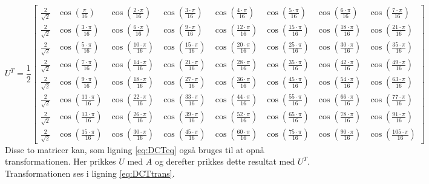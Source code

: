 \begin{equation}
U^T = \frac{1}{2}
\begin{bmatrix}
\frac{2}{\sqrt{2}} & \cos(\frac{\pi}{16}) & \cos(\frac{2 \cdot \pi}{16}) & \cos(\frac{3 \cdot \pi}{16}) & \cos(\frac{4 \cdot \pi}{16}) & \cos(\frac{5 \cdot \pi}{16}) & \cos(\frac{6 \cdot \pi}{16}) & \cos(\frac{7 \cdot \pi}{16}) \\
\frac{2}{\sqrt{2}} & \cos(\frac{3 \cdot \pi}{16}) & \cos(\frac{6 \cdot \pi}{16}) & \cos(\frac{9 \cdot \pi}{16}) & \cos(\frac{12 \cdot \pi}{16}) & \cos(\frac{15 \cdot \pi}{16}) & \cos(\frac{18 \cdot \pi}{16}) & \cos(\frac{21 \cdot \pi}{16}) \\
\frac{2}{\sqrt{2}} & \cos(\frac{5 \cdot \pi}{16}) & \cos(\frac{10 \cdot \pi}{16}) & \cos(\frac{15 \cdot \pi}{16}) & \cos(\frac{20 \cdot \pi}{16}) & \cos(\frac{25\cdot \pi}{16}) & \cos(\frac{30 \cdot \pi}{16}) & \cos(\frac{35 \cdot \pi}{16}) \\
\frac{2}{\sqrt{2}} & \cos(\frac{7 \cdot \pi}{16}) & \cos(\frac{14 \cdot \pi}{16}) & \cos(\frac{21 \cdot \pi}{16}) & \cos(\frac{28 \cdot \pi}{16}) & \cos(\frac{35 \cdot \pi}{16}) & \cos(\frac{42 \cdot \pi}{16}) & \cos(\frac{49 \cdot \pi}{16}) \\
\frac{2}{\sqrt{2}} & \cos(\frac{9 \cdot \pi}{16}) & \cos(\frac{18 \cdot \pi}{16}) & \cos(\frac{27 \cdot \pi}{16}) & \cos(\frac{36 \cdot \pi}{16}) & \cos(\frac{45 \cdot \pi}{16}) & \cos(\frac{54 \cdot \pi}{16}) & \cos(\frac{63 \cdot \pi}{16}) \\
\frac{2}{\sqrt{2}} & \cos(\frac{11 \cdot \pi}{16}) & \cos(\frac{22 \cdot \pi}{16}) & \cos(\frac{33 \cdot \pi}{16}) & \cos(\frac{44 \cdot \pi}{16}) & \cos(\frac{55 \cdot \pi}{16}) & \cos(\frac{66 \cdot \pi}{16}) & \cos(\frac{77 \cdot \pi}{16}) \\
\frac{2}{\sqrt{2}} & \cos(\frac{13 \cdot \pi}{16}) & \cos(\frac{26 \cdot \pi}{16}) & \cos(\frac{39 \cdot \pi}{16}) & \cos(\frac{52 \cdot \pi}{16}) & \cos(\frac{65 \cdot \pi}{16}) & \cos(\frac{78 \cdot \pi}{16}) & \cos(\frac{91 \cdot \pi}{16}) \\
\frac{2}{\sqrt{2}} & \cos(\frac{15 \cdot \pi}{16}) & \cos(\frac{30 \cdot \pi}{16}) & \cos(\frac{45 \cdot \pi}{16}) & \cos(\frac{60 \cdot \pi}{16}) & \cos(\frac{75 \cdot \pi}{16}) & \cos(\frac{90 \cdot \pi}{16}) & \cos(\frac{105 \cdot \pi}{16})
\end{bmatrix}
\label{eq:DCTmatrixT}
\end{equation}
Disse to matricer kan, som ligning \vref{eq:DCTeq} også bruges til at opnå transformationen. Her prikkes $U$ med $A$ og derefter prikkes dette resultat med $U^T$. Transformationen ses i ligning \vref{eq:DCTtrans}.
